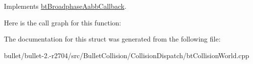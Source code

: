 Implements \hyperlink{structbt_broadphase_aabb_callback}{bt\+Broadphase\+Aabb\+Callback}.



Here is the call graph for this function\+:




The documentation for this struct was generated from the following file\+:\begin{DoxyCompactItemize}
\item 
bullet/bullet-\/2.-\/r2704/src/\+Bullet\+Collision/\+Collision\+Dispatch/bt\+Collision\+World.\+cpp\end{DoxyCompactItemize}
